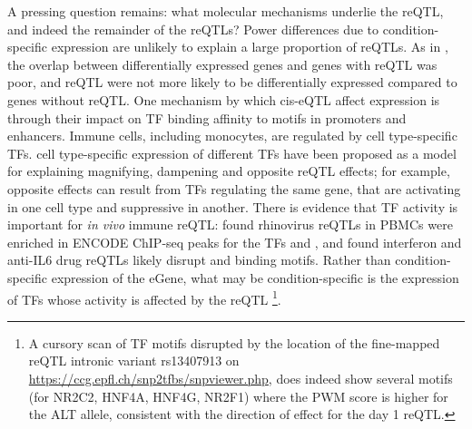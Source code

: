 
A pressing question remains: what molecular mechanisms underlie the  \gls{reQTL}, and indeed the remainder of the \glspl{reQTL}?
Power differences due to condition-specific expression are unlikely to explain a large proportion of reQTLs.
As in \autocite{kim-hellmuth2017GeneticRegulatoryEffects, davenport2018DiscoveringVivoCytokineeQTL}, the overlap between differentially expressed genes and genes with reQTL was poor,
and reQTL were not more likely to be differentially expressed compared to genes without reQTL.
%
One mechanism by which cis-eQTL affect expression is through their impact on \gls{TF} binding affinity to motifs in promoters and enhancers\autocite{pai2015GeneticMechanisticBasis}.
Immune cells, including monocytes, are regulated by cell type-specific \glspl{TF}\autocite{choudhury2016IdentifyingCellTypeSpecific}.
cell type-specific expression of different \glspl{TF} have been proposed as a model for explaining magnifying, dampening and opposite reQTL effects;
for example, opposite effects can result from \glspl{TF} regulating the same gene, that are activating in one cell type and suppressive in another\autocite{fu2012UnravelingRegulatoryMechanisms}.
There is evidence that \gls{TF} activity is important for \textit{in vivo} immune reQTL:
\autocite{caliskan2015HostGeneticVariation} found rhinovirus reQTLs in \glspl{PBMC} were enriched in ENCODE ChIP-seq peaks for the \glspl{TF}  and ,
and \autocite{davenport2018DiscoveringVivoCytokineeQTL} found interferon and anti-IL6 drug reQTLs likely disrupt  and  binding motifs.
Rather than condition-specific expression of the eGene, what may be condition-specific is the expression of \glspl{TF} whose activity is affected by the reQTL%
\footnote{
    A cursory scan of \gls{TF} motifs disrupted by the location of the fine-mapped  reQTL intronic variant rs13407913 on \url{https://ccg.epfl.ch/snp2tfbs/snpviewer.php},
    does indeed show several motifs (for NR2C2, HNF4A, HNF4G, NR2F1)
    where the PWM score is higher for the ALT allele, 
    consistent with the direction of effect for the day 1 reQTL.
}.

